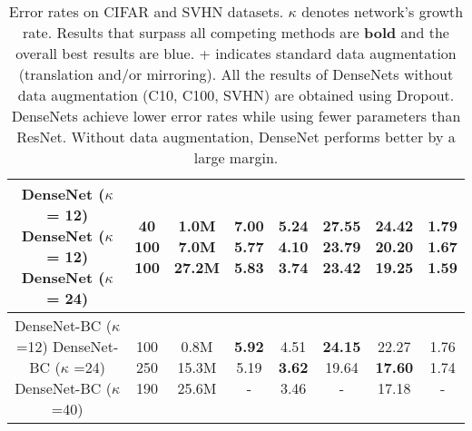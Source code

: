 \documentclass[10pt,letterpaper]{article}
\begin{document}
\begin{table}[H]
\begin{center}
\begin{tabular}{c|c|c|c|c|c|c|c}
  \makecell[l]{DenseNet ($\kappa$ = 12) \\ DenseNet ($\kappa$ = 12) \\ DenseNet ($\kappa$ = 24)} &
  \makecell[c]{40 \\ 100 \\ 100} &
  \makecell[c]{1.0M \\ 7.0M \\ 27.2M} &
  \makecell[c]{{\bf 7.00} \\ {\bf 5.77} \\ {\bf 5.83}} &
  \makecell[c]{5.24 \\ {\bf 4.10} \\ {\bf 3.74}} &
  \makecell[c]{{\bf 27.55} \\ {\bf 23.79} \\ {\bf 23.42}} &
  \makecell[c]{24.42 \\ {\bf 20.20} \\ {\bf 19.25}} &
  \makecell[c]{1.79 \\ 1.67 \\ {\color{blue} 1.59}} \\ \hline

  \makecell[l]{DenseNet-BC ($\kappa$ =12) \\ DenseNet-BC ($\kappa$ =24) \\ DenseNet-BC ($\kappa$ =40)} & 
  \makecell[c]{100 \\ 250 \\ 190} & 
  \makecell[c]{0.8M \\ 15.3M \\ 25.6M} & 
  \makecell[c]{{\bf 5.92} \\ {\color{blue} 5.19} \\ -} & 
  \makecell[c]{4.51 \\ {\bf 3.62} \\ {\color{blue} 3.46}} & 
  \makecell[c]{{\bf 24.15} \\ {\color{blue} 19.64} \\ -} & 
  \makecell[c]{22.27 \\ {\bf 17.60} \\ {\color{blue} 17.18}} & 
  \makecell[c]{1.76 \\ 1.74 \\ -} \\ 
  \hline
\end{tabular}
\caption{Error rates on CIFAR and SVHN datasets. $\kappa$ denotes network’s growth rate. Results that surpass all competing methods are {\bf bold} and the overall best results are {\color{blue} blue}. + indicates standard data augmentation (translation and/or mirroring). All the results of DenseNets without data augmentation (C10, C100, SVHN) are obtained using Dropout. DenseNets achieve lower error rates while using fewer parameters than ResNet. Without data augmentation, DenseNet performs better by a large margin.}
\label{tab}
\end{center}
\end{table}
\end{document}
